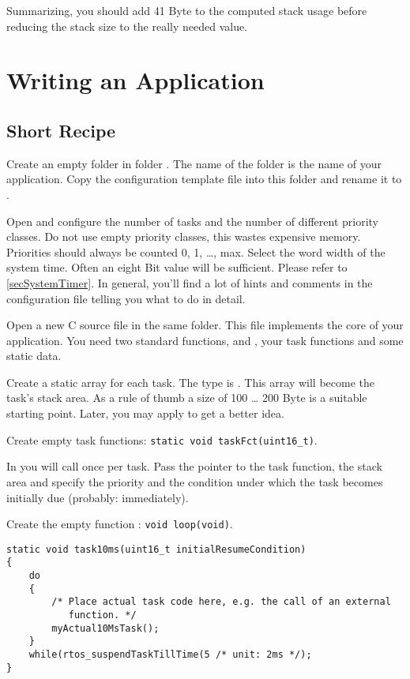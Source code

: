 Summarizing, you should add 41 Byte to the computed stack usage before
reducing the stack size to the really needed value.


\chapter{Writing an \rtos{} Application}
\label{secHowToWriteApp}

\section{Short Recipe}

Create an empty folder in folder .
The name of the folder is the name of your application. Copy the
configuration template file  into this folder and
rename it to .

Open  and configure the number of tasks and the
number of different priority classes. Do not use empty priority classes,
this wastes expensive memory. Priorities should always be counted 0, 1,
\ldots{}, max. Select the word width of the system time. Often an eight Bit
value will be sufficient. Please refer to \ref{secSystemTimer}. In
general, you'll find a lot of hints and comments in the configuration file
telling you what to do in detail.

Open a new C source file in the same folder. This file implements the core
of your application. You need two standard functions,  and
, your task functions and some static data.

Create a static array for each task. The type is . This
array will become the task's stack area. As a rule of thumb a size of 100
\ldots{} 200 Byte is a suitable starting point. Later, you may apply
 to get a better idea.

Create empty task functions: \verb+static void taskFct(uint16_t)+.

In  you will call  once per task.
Pass the pointer to the task function, the stack area and specify the
priority and the condition under which the task becomes initially due
(probably: immediately).

Create the empty function : \verb+void loop(void)+.

\begin{lstlisting}[float, caption={Typical task, regularly activated},
label=lstTypicalTask, captionpos=b]
static void task10ms(uint16_t initialResumeCondition)
{
    do
    {
        /* Place actual task code here, e.g. the call of an external
           function. */
        myActual10MsTask();
    }
    while(rtos_suspendTaskTillTime(5 /* unit: 2ms */);
}
\end{lstlisting}


